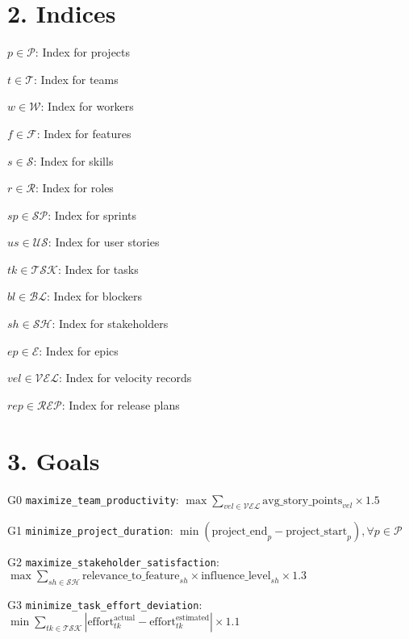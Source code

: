 \documentclass[12pt]{article}
\begin{document}
\section{2. Indices}
\item $p \in \mathcal{P}$: Index for projects
    \item $t \in \mathcal{T}$: Index for teams
    \item $w \in \mathcal{W}$: Index for workers
    \item $f \in \mathcal{F}$: Index for features
    \item $s \in \mathcal{S}$: Index for skills
    \item $r \in \mathcal{R}$: Index for roles
    \item $sp \in \mathcal{SP}$: Index for sprints
    \item $us \in \mathcal{US}$: Index for user stories
    \item $tk \in \mathcal{TSK}$: Index for tasks
    \item $bl \in \mathcal{BL}$: Index for blockers
    \item $sh \in \mathcal{SH}$: Index for stakeholders
    \item $ep \in \mathcal{E}$: Index for epics
    \item $vel \in \mathcal{VEL}$: Index for velocity records
    \item $rep \in \mathcal{REP}$: Index for release plans

\section{3. Goals}
\item[G0] \texttt{maximize\_team\_productivity}: 
    $\max \sum_{vel \in \mathcal{VEL}} \text{avg\_story\_points}_{vel} \times 1.5$
    
    \item[G1] \texttt{minimize\_project\_duration}: 
    $\min (\text{project\_end}_p - \text{project\_start}_p), \forall p \in \mathcal{P}$
    
    \item[G2] \texttt{maximize\_stakeholder\_satisfaction}: 
    $\max \sum_{sh \in \mathcal{SH}} \text{relevance\_to\_feature}_{sh} \times \text{influence\_level}_{sh} \times 1.3$
    
    \item[G3] \texttt{minimize\_task\_effort\_deviation}: 
    $\min \sum_{tk \in \mathcal{TSK}} |\text{effort}_{tk}^{\text{actual}} - \text{effort}_{tk}^{\text{estimated}}| \times 1.1$
    
\end{document}

